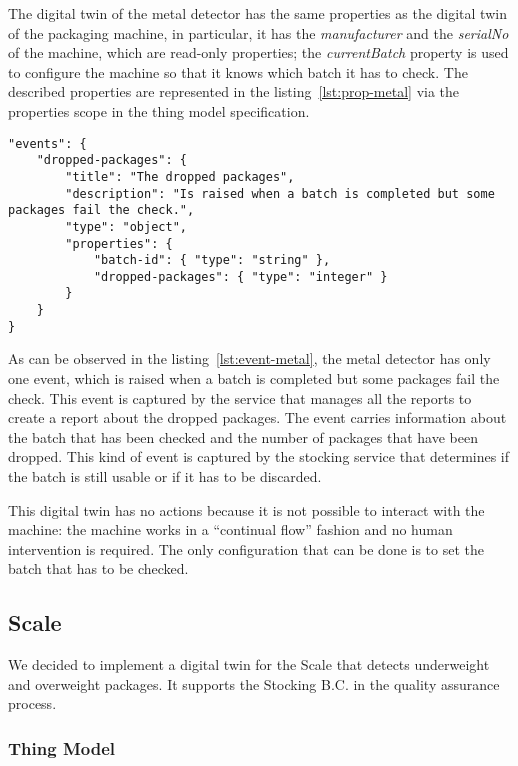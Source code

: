 The digital twin of the metal detector has the same properties as the digital twin of the packaging machine, in particular, it has the \textit{manufacturer} and the \textit{serialNo} of the machine, which are read-only properties; the \textit{currentBatch} property is used to configure the machine so that it knows which batch it has to check. The described properties are represented in the listing~\ref{lst:prop-metal} via the properties
scope in the thing model specification.

\newpage

\begin{lstlisting}[caption={Events of the metal detector Thing Model.},label={lst:event-metal}]
"events": {
	"dropped-packages": {
		"title": "The dropped packages",
		"description": "Is raised when a batch is completed but some packages fail the check.",
		"type": "object",
		"properties": {
			"batch-id": { "type": "string" },
			"dropped-packages": { "type": "integer" }
		}
	}
}
\end{lstlisting}

As can be observed in the listing~\ref{lst:event-metal}, the metal detector has only one event, which is raised when a batch is completed but some packages fail the check. This event is captured by the service that manages all the reports to create a report about the dropped packages.
The event carries information about the batch that has been checked and the number of packages that have been dropped.
This kind of event is captured by the stocking service that determines if the batch is still usable or if it has to be discarded.

This digital twin has no actions because it is not possible to interact with the machine: the machine works in a ``continual flow'' fashion and no human intervention is required. The only configuration that can be done is to set the batch that has to be checked.

\newpage

\subsection{Scale}
We decided to implement a digital twin for the Scale that detects underweight and overweight packages.
It supports the Stocking B.C. in the quality assurance process.

\subsubsection{Thing Model}


